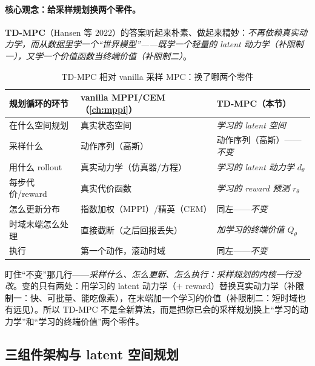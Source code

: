 \paragraph{核心观念：给采样规划换两个零件。}
\textbf{TD-MPC}（Hansen 等 $2022$）的答案听起来朴素、做起来精妙：\emph{不再依赖真实动力学，而从数据里学一个“世界模型”——既学一个轻量的 latent 动力学（补限制一），又学一个价值函数当终端价值（补限制二）}\cite{hansen2022tdmpc}。

\begin{table}[H]\centering\small
\caption{TD-MPC 相对 vanilla 采样 MPC：换了哪两个零件}
\label{tab:mv-twoparts}
\begin{tabular}{p{} p{} p{}}
\toprule
规划循环的环节 & vanilla MPPI/CEM（\cref{ch:mppi}） & TD-MPC（本节） \\
\midrule
在什么空间规划 & 真实状态空间 & \emph{学习的 latent 空间} \\
采样什么 & 动作序列（高斯） & 动作序列（高斯）——\emph{不变} \\
用什么 rollout & 真实动力学（仿真器/方程） & \emph{学习的 latent 动力学 $d_\theta$} \\
每步代价/reward & 真实代价函数 & \emph{学习的 reward 预测 $r_\theta$} \\
怎么更新分布 & 指数加权（MPPI）/精英（CEM） & 同左——\emph{不变} \\
时域末端怎么处理 & 直接截断（之后回报丢失） & \emph{加学习的终端价值 $Q_\theta$} \\
执行 & 第一个动作，滚动时域 & 同左——\emph{不变} \\
\bottomrule
\end{tabular}
\end{table}

\noindent 盯住“不变”那几行——\emph{采样什么、怎么更新、怎么执行：采样规划的内核一行没改}。变的只有两处：用学习的 latent 动力学（$+$ reward）替换真实动力学（补限制一：快、可批量、能吃像素），在末端加一个学习的价值（补限制二：短时域也有远见）。所以 TD-MPC 不是全新算法，而是把你已会的采样规划换上“学习的动力学”和“学习的终端价值”两个零件。

\subsection{三组件架构与 latent 空间规划}
\label{sec:mv-tdmpc-arch}

